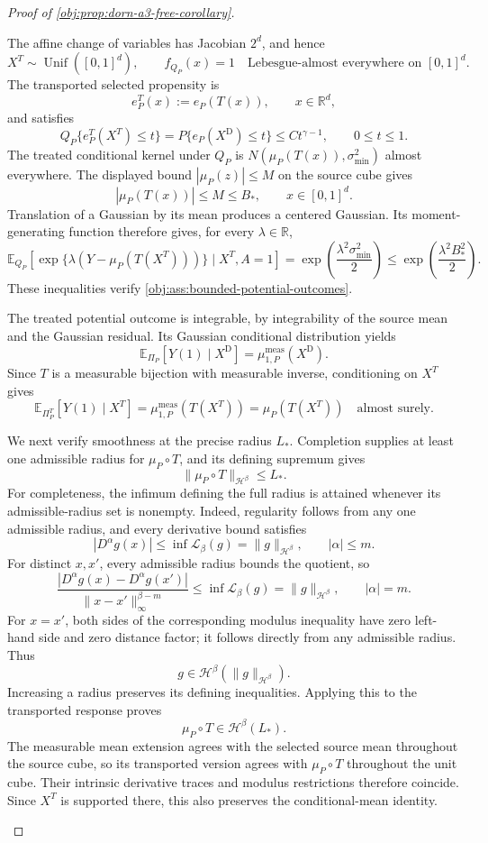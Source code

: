 \documentclass[11pt]{article}
\begin{document}
\begin{proof}[Proof of \cref{obj:prop:dorn-a3-free-corollary}]
\begin{enumerate}
The affine change of variables has Jacobian \(2^d\), and hence
\[
X^T\sim\operatorname{Unif}([0,1]^d),
\qquad
f_{Q_P}(x)=1
\quad\text{Lebesgue-almost everywhere on }[0,1]^d.
\]
The transported selected propensity is
\[
e_P^T(x):=e_P(T(x)),
\qquad x\in\mathbb R^d,
\]
and satisfies
\[
Q_P\{e_P^T(X^T)\le t\}
=
P\{e_P(X^{\mathrm D})\le t\}
\le Ct^{\gamma-1},
\qquad 0\le t\le1.
\]
The treated conditional kernel under \(Q_P\) is
\(N(\mu_P(T(x)),\sigma_{\min}^2)\) almost everywhere. The displayed bound \(|\mu_P(z)|\le M\) on the source cube gives
\[
|\mu_P(T(x))|\le M\le B_*,
\qquad x\in[0,1]^d.
\]
Translation of a Gaussian by its mean produces a centered Gaussian. Its moment-generating function therefore gives, for every \(\lambda\in\mathbb R\),
\[
\mathbb E_{Q_P}\!\left[
\exp\{\lambda(Y-\mu_P(T(X^T)))\}
\mid X^T,A=1
\right]
=
\exp\!\left(\frac{\lambda^2\sigma_{\min}^2}{2}\right)
\le
\exp\!\left(\frac{\lambda^2B_*^2}{2}\right).
\]
These inequalities verify \cref{obj:ass:bounded-potential-outcomes}.

The treated potential outcome is integrable, by integrability of the source mean and the Gaussian residual. Its Gaussian conditional distribution yields
\[
\mathbb E_{\Pi_P}[Y(1)\mid X^{\mathrm D}]
=
\mu_{1,P}^{\mathrm{meas}}(X^{\mathrm D}).
\]
Since \(T\) is a measurable bijection with measurable inverse, conditioning on \(X^T\) gives
\[
\mathbb E_{\Pi_P^T}[Y(1)\mid X^T]
=
\mu_{1,P}^{\mathrm{meas}}(T(X^T))
=
\mu_P(T(X^T))
\quad\text{almost surely}.
\]

We next verify smoothness at the precise radius \(L_*\). Completion supplies at least one admissible radius for \(\mu_P\circ T\), and its defining supremum gives
\[
\|\mu_P\circ T\|_{\mathcal H^\beta}\le L_*.
\]
For completeness, the infimum defining the full radius is attained whenever its admissible-radius set is nonempty. Indeed, regularity follows from any one admissible radius, and every derivative bound satisfies
\[
|D^\alpha g(x)|
\le
\inf\mathscr L_\beta(g)
=
\|g\|_{\mathcal H^\beta},
\qquad |\alpha|\le m.
\]
For distinct \(x,x'\), every admissible radius bounds the quotient, so
\[
\frac{|D^\alpha g(x)-D^\alpha g(x')|}
{\|x-x'\|_\infty^{\beta-m}}
\le
\inf\mathscr L_\beta(g)
=
\|g\|_{\mathcal H^\beta},
\qquad |\alpha|=m.
\]
For \(x=x'\), both sides of the corresponding modulus inequality have zero left-hand side and zero distance factor; it follows directly from any admissible radius. Thus
\[
g\in\mathcal H^\beta(\|g\|_{\mathcal H^\beta}).
\]
Increasing a radius preserves its defining inequalities. Applying this to the transported response proves
\[
\mu_P\circ T\in\mathcal H^\beta(L_*).
\]
The measurable mean extension agrees with the selected source mean throughout the source cube, so its transported version agrees with \(\mu_P\circ T\) throughout the unit cube. Their intrinsic derivative traces and modulus restrictions therefore coincide. Since \(X^T\) is supported there, this also preserves the conditional-mean identity.


\end{enumerate}
\end{proof}
\end{document}
